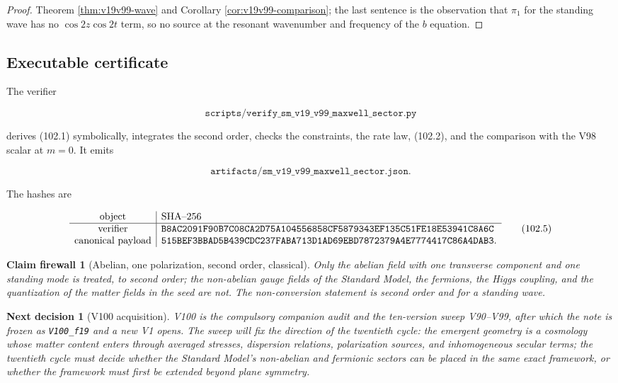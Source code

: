 \documentclass[11pt]{article}
\newtheorem{firewall}[theorem]{Claim firewall}
\newtheorem{decision}[theorem]{Next decision}
\theoremstyle{remark}
\begin{document}
\begin{proof}
Theorem \ref{thm:v19v99-wave} and Corollary
\ref{cor:v19v99-comparison}; the last sentence is the observation that
\(\pi_1\) for the standing wave has no \(\cos2z\cos2t\) term, so no
source at the resonant wavenumber and frequency of the \(b\)
equation.
\end{proof}

\subsection{Executable certificate}

The verifier

\[
 \texttt{scripts/verify\_sm\_v19\_v99\_maxwell\_sector.py}            \tag{102.3}
\]

derives (102.1) symbolically, integrates the second order, checks the
constraints, the rate law, (102.2), and the comparison with the V98
scalar at \(m=0\).  It emits

\[
 \texttt{artifacts/sm\_v19\_v99\_maxwell\_sector.json}.               \tag{102.4}
\]

The hashes are

\[
\begin{array}{c|l}
\hbox{object}&\hbox{SHA--256}\\ \hline
\hbox{verifier}&
\texttt{B8AC2091F90B7C08CA2D75A104556858CF5879343EF135C51FE18E53941C8A6C}\\
\hbox{canonical payload}&
\texttt{515BEF3BBAD5B439CDC237FABA713D1AD69EBD7872379A4E7774417C86A4DAB3}.
\end{array}                                                     \tag{102.5}
\]

\begin{firewall}[Abelian, one polarization, second order, classical]
\label{fire:v19v99}
Only the abelian field with one transverse component and one
standing mode is treated, to second order; the non-abelian gauge
fields of the Standard Model, the fermions, the Higgs coupling, and
the quantization of the matter fields in the seed are not.  The
non-conversion statement is second order and for a standing wave.
\end{firewall}

\begin{decision}[V100 acquisition]
\label{dec:v19v99-next}
V100 is the compulsory companion audit and the ten-version sweep
V90--V99, after which the note is frozen as \texttt{V100\_f19} and a
new V1 opens.  The sweep will fix the direction of the twentieth
cycle: the emergent geometry is a cosmology whose matter content
enters through averaged stresses, dispersion relations, polarization
sources, and inhomogeneous secular terms; the twentieth cycle must
decide whether the Standard Model's non-abelian and fermionic sectors
can be placed in the same exact framework, or whether the framework
must first be extended beyond plane symmetry.
\end{decision}
\end{document}
